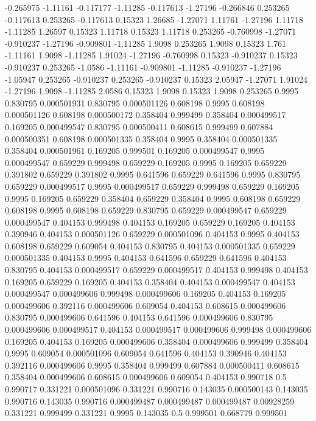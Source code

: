 -0.265975 -1.11161
-0.117177 -1.11285
-0.117613 -1.27196
-0.266846 0.253265
-0.117613 0.253265
-0.117613 0.15323
1.26685 -1.27071
1.11761 -1.27196
1.11718 -1.11285
1.26597 0.15323
1.11718 0.15323
1.11718 0.253265
-0.760998 -1.27071
-0.910237 -1.27196
-0.909801 -1.11285
1.9098 0.253265
1.9098 0.15323
1.761 -1.11161
1.9098 -1.11285
1.91024 -1.27196
-0.760998 0.15323
-0.910237 0.15323
-0.910237 0.253265
-1.0586 -1.11161
-0.909801 -1.11285
-0.910237 -1.27196
-1.05947 0.253265
-0.910237 0.253265
-0.910237 0.15323
2.05947 -1.27071
1.91024 -1.27196
1.9098 -1.11285
2.0586 0.15323
1.9098 0.15323
1.9098 0.253265
0.9995 0.830795
0.000501931 0.830795
0.000501126 0.608198
0.9995 0.608198
0.000501126 0.608198
0.000500172 0.358404
0.999499 0.358404
0.000499517 0.169205
0.000499547 0.830795
0.000500411 0.608615
0.999499 0.607884
0.000500351 0.608198
0.000501335 0.358404
0.9995 0.358404
0.000501335 0.358404
0.000501961 0.169205
0.999501 0.169205
0.000499547 0.9995
0.000499547 0.659229
0.999498 0.659229
0.169205 0.9995
0.169205 0.659229
0.391802 0.659229
0.391802 0.9995
0.641596 0.659229
0.641596 0.9995
0.830795 0.659229
0.000499517 0.9995
0.000499517 0.659229
0.999498 0.659229
0.169205 0.9995
0.169205 0.659229
0.358404 0.659229
0.358404 0.9995
0.608198 0.659229
0.608198 0.9995
0.608198 0.659229
0.830795 0.659229
0.000499547 0.659229
0.000499547 0.404153
0.999498 0.404153
0.169205 0.659229
0.169205 0.404153
0.390946 0.404153
0.000501126 0.659229
0.000501096 0.404153
0.9995 0.404153
0.608198 0.659229
0.609054 0.404153
0.830795 0.404153
0.000501335 0.659229
0.000501335 0.404153
0.9995 0.404153
0.641596 0.659229
0.641596 0.404153
0.830795 0.404153
0.000499517 0.659229
0.000499517 0.404153
0.999498 0.404153
0.169205 0.659229
0.169205 0.404153
0.358404 0.404153
0.000499547 0.404153
0.000499547 0.000499606
0.999498 0.000499606
0.169205 0.404153
0.169205 0.000499606
0.392116 0.000499606
0.609054 0.404153
0.608615 0.000499606
0.830795 0.000499606
0.641596 0.404153
0.641596 0.000499606
0.830795 0.000499606
0.000499517 0.404153
0.000499517 0.000499606
0.999498 0.000499606
0.169205 0.404153
0.169205 0.000499606
0.358404 0.000499606
0.999499 0.358404
0.9995 0.609054
0.000501096 0.609054
0.641596 0.404153
0.390946 0.404153
0.392116 0.000499606
0.9995 0.358404
0.999499 0.607884
0.000500411 0.608615
0.358404 0.000499606
0.608615 0.000499606
0.609054 0.404153
0.990718 0.5
0.990717 0.331221
0.000501096 0.331221
0.990716 0.143035
0.000500143 0.143035
0.990716 0.143035
0.990716 0.000499487
0.000499487 0.000499487
0.00928259 0.331221
0.999499 0.331221
0.9995 0.143035
0.5 0.999501
0.668779 0.999501
